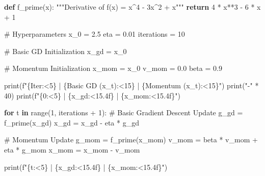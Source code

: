 \documentclass[
  letterpaper,
  DIV=11,
  numbers=noendperiod]{scrreprt}
\newenvironment{Shaded}{\begin{snugshade}}{\end{snugshade}}
\newcommand{\BuiltInTok}[1]{\textcolor[rgb]{0.00,0.23,0.31}{#1}}
\newcommand{\CommentTok}[1]{\textcolor[rgb]{0.37,0.37,0.37}{#1}}
\newcommand{\ControlFlowTok}[1]{\textcolor[rgb]{0.00,0.23,0.31}{\textbf{#1}}}
\newcommand{\DecValTok}[1]{\textcolor[rgb]{0.68,0.00,0.00}{#1}}
\newcommand{\FloatTok}[1]{\textcolor[rgb]{0.68,0.00,0.00}{#1}}
\newcommand{\KeywordTok}[1]{\textcolor[rgb]{0.00,0.23,0.31}{\textbf{#1}}}
\newcommand{\NormalTok}[1]{\textcolor[rgb]{0.00,0.23,0.31}{#1}}
\newcommand{\OperatorTok}[1]{\textcolor[rgb]{0.37,0.37,0.37}{#1}}
\newcommand{\SpecialCharTok}[1]{\textcolor[rgb]{0.37,0.37,0.37}{#1}}
\newcommand{\SpecialStringTok}[1]{\textcolor[rgb]{0.13,0.47,0.30}{#1}}
\newcommand{\StringTok}[1]{\textcolor[rgb]{0.13,0.47,0.30}{#1}}
\begin{document}
\begin{Shaded}
\begin{Highlighting}[]
\KeywordTok{def}\NormalTok{ f\_prime(x):}
    \CommentTok{"""Derivative of f(x) = x\^{}4 {-} 3x\^{}2 + x"""}
    \ControlFlowTok{return} \DecValTok{4} \OperatorTok{*}\NormalTok{ x}\OperatorTok{**}\DecValTok{3} \OperatorTok{{-}} \DecValTok{6} \OperatorTok{*}\NormalTok{ x }\OperatorTok{+} \DecValTok{1}

\CommentTok{\# Hyperparameters}
\NormalTok{x\_0 }\OperatorTok{=} \FloatTok{2.5}
\NormalTok{eta }\OperatorTok{=} \FloatTok{0.01}
\NormalTok{iterations }\OperatorTok{=} \DecValTok{10}

\CommentTok{\# Basic GD Initialization}
\NormalTok{x\_gd }\OperatorTok{=}\NormalTok{ x\_0}

\CommentTok{\# Momentum Initialization}
\NormalTok{x\_mom }\OperatorTok{=}\NormalTok{ x\_0}
\NormalTok{v\_mom }\OperatorTok{=} \FloatTok{0.0}
\NormalTok{beta }\OperatorTok{=} \FloatTok{0.9}

\BuiltInTok{print}\NormalTok{(}\SpecialStringTok{f"}\SpecialCharTok{\{}\StringTok{\textquotesingle{}Iter\textquotesingle{}}\SpecialCharTok{:\textless{}5\}}\SpecialStringTok{ | }\SpecialCharTok{\{}\StringTok{\textquotesingle{}Basic GD (x\_t)\textquotesingle{}}\SpecialCharTok{:\textless{}15\}}\SpecialStringTok{ | }\SpecialCharTok{\{}\StringTok{\textquotesingle{}Momentum (x\_t)\textquotesingle{}}\SpecialCharTok{:\textless{}15\}}\SpecialStringTok{"}\NormalTok{)}
\BuiltInTok{print}\NormalTok{(}\StringTok{"{-}"} \OperatorTok{*} \DecValTok{40}\NormalTok{)}
\BuiltInTok{print}\NormalTok{(}\SpecialStringTok{f"}\SpecialCharTok{\{}\DecValTok{0}\SpecialCharTok{:\textless{}5\}}\SpecialStringTok{ | }\SpecialCharTok{\{}\NormalTok{x\_gd}\SpecialCharTok{:\textless{}15.4f\}}\SpecialStringTok{ | }\SpecialCharTok{\{}\NormalTok{x\_mom}\SpecialCharTok{:\textless{}15.4f\}}\SpecialStringTok{"}\NormalTok{)}

\ControlFlowTok{for}\NormalTok{ t }\KeywordTok{in} \BuiltInTok{range}\NormalTok{(}\DecValTok{1}\NormalTok{, iterations }\OperatorTok{+} \DecValTok{1}\NormalTok{):}
    \CommentTok{\# Basic Gradient Descent Update}
\NormalTok{    g\_gd }\OperatorTok{=}\NormalTok{ f\_prime(x\_gd)}
\NormalTok{    x\_gd }\OperatorTok{=}\NormalTok{ x\_gd }\OperatorTok{{-}}\NormalTok{ eta }\OperatorTok{*}\NormalTok{ g\_gd}
    
    \CommentTok{\# Momentum Update}
\NormalTok{    g\_mom }\OperatorTok{=}\NormalTok{ f\_prime(x\_mom)}
\NormalTok{    v\_mom }\OperatorTok{=}\NormalTok{ beta }\OperatorTok{*}\NormalTok{ v\_mom }\OperatorTok{+}\NormalTok{ eta }\OperatorTok{*}\NormalTok{ g\_mom}
\NormalTok{    x\_mom }\OperatorTok{=}\NormalTok{ x\_mom }\OperatorTok{{-}}\NormalTok{ v\_mom}
    
    \BuiltInTok{print}\NormalTok{(}\SpecialStringTok{f"}\SpecialCharTok{\{}\NormalTok{t}\SpecialCharTok{:\textless{}5\}}\SpecialStringTok{ | }\SpecialCharTok{\{}\NormalTok{x\_gd}\SpecialCharTok{:\textless{}15.4f\}}\SpecialStringTok{ | }\SpecialCharTok{\{}\NormalTok{x\_mom}\SpecialCharTok{:\textless{}15.4f\}}\SpecialStringTok{"}\NormalTok{)}
\end{Highlighting}
\end{Shaded}
\end{document}
